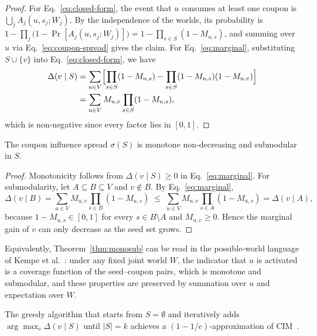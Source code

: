 \documentclass[sigconf]{acmart}
\begin{document}
\begin{proof}\renewcommand{\qedsymbol}{}
For Eq.~\eqref{eq:closed-form}, the event that $u$ consumes at least
one coupon is $\bigcup_{j} A_j(u,s_j;W_j)$. By the independence of
the worlds, its probability is
$1-\prod_{j}\bigl(1-\Pr[A_j(u,s_j;W_j)]\bigr)
=1-\prod_{s\in S}(1-M_{u,s})$, and summing over $u$ via
Eq.~\eqref{eq:coupon-spread} gives the claim.
For Eq.~\eqref{eq:marginal}, substituting $S\cup\{v\}$ into
Eq.~\eqref{eq:closed-form}, we have
\begin{align}
\Delta(v\mid S)
&=
\sum_{u\in V}
\Bigl[\prod_{s\in S}(1-M_{u,s})
-\prod_{s\in S}(1-M_{u,s})(1-M_{u,v})\Bigr]\nonumber\\
&=
\sum_{u\in V}M_{u,v}\prod_{s\in S}(1-M_{u,s}),
\end{align}
which is non-negative since every factor lies in $[0,1]$.
\end{proof}

\begin{theorem}
\label{thm:monosub}
The coupon influence spread $\sigma(S)$ is monotone non-decreasing
and submodular in $S$.
\end{theorem}

\begin{proof}\renewcommand{\qedsymbol}{}
Monotonicity follows from $\Delta(v\mid S)\ge 0$ in
Eq.~\eqref{eq:marginal}.
For submodularity, let $A\subseteq B\subseteq V$ and $v\notin B$.
By Eq.~\eqref{eq:marginal},
\[
\Delta(v\mid B)
=
\sum_{u\in V}M_{u,v}\prod_{s\in B}(1-M_{u,s})
\;\le\;
\sum_{u\in V}M_{u,v}\prod_{s\in A}(1-M_{u,s})
=
\Delta(v\mid A),
\]
because $1-M_{u,s}\in[0,1]$ for every $s\in B\setminus A$ and
$M_{u,v}\ge 0$.
Hence the marginal gain of $v$ can only decrease as the seed set
grows.
\end{proof}

Equivalently, Theorem~\ref{thm:monosub} can be read in the
possible-world language of Kempe et al.~\cite{kempe2003maximizing}:
under any fixed joint world $W$, the indicator that $u$ is activated
is a coverage function of the seed--coupon pairs, which is monotone
and submodular, and these properties are preserved by summation over
$u$ and expectation over $W$.

\begin{corollary}
\label{cor:greedy}
The greedy algorithm that starts from $S=\emptyset$ and iteratively
adds $\arg\max_{v}\Delta(v\mid S)$ until $|S|=k$ achieves a
$(1-1/e)$-approximation of CIM~\cite{nemhauser1978analysis}.
\end{corollary}
\end{document}
